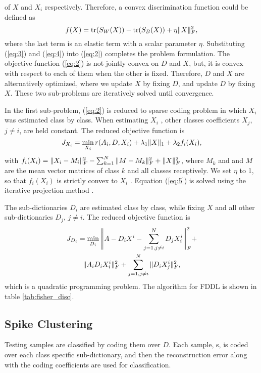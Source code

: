 \documentclass[conference]{IEEEtran}
\begin{document}
	of $X$ and $X_i$ respectively. Therefore, a convex discrimination
	function could be defined as
	\begin{equation}
		\label{eq:4}
		f(X)=\mathrm{tr}(S_W(X))-\mathrm{tr}(S_B(X))+\eta\Vert{X}\Vert_F^2,
	\end{equation}
	where the last term is an elastic term with a scalar parameter $\eta$. Substituting (\ref{eq:3}) and (\ref{eq:4}) into (\ref{eq:2}) completes the problem formulation. The objective function (\ref{eq:2}) is not jointly convex on $D$ and $X$, but, it is convex with respect to each of them when the other is fixed. Therefore, $D$ and $X$ are alternatively optimized, where we update $X$ by fixing $D$, and update $D$ by fixing $X$. These two sub-problems are iteratively solved until convergence.
	
	In the first sub-problem, (\ref{eq:2}) is reduced to sparse coding problem in which $X_i$ was estimated class by class. When estimating $X_i$ , other classes coefficients $X_j$, $j \neq i$, are held constant. The reduced objective function is
	\begin{equation}
		\label{eq:5}
		J_{X_i}=\min_{X_i}r(A_i,D,X_i)+\lambda_1\Vert{X}\Vert_1+\lambda_2f_i(X_i),
	\end{equation}
	with $f_i(X_i)=\Vert{X_i-M_i}\Vert_F^2-\sum_{k=1}^{N}\Vert{M-M_k}\Vert_F^2+\Vert{X}\Vert_F^2$, where $M_k$ and and $M$ are the mean vector matrices of class $k$ and all classes receptively. We set $\eta$ to 1, so that $f_i(X_i)$ is strictly convex to $X_i$ . Equation (\ref{eq:5}) is solved using the iterative projection method \cite{yang2011fisher}.
	
	The sub-dictionaries $D_i$ are estimated class by class, while fixing $X$ and all other sub-dictionaries $D_j$, $j\neq i$. The reduced objective function is
	\begin{multline}
		\label{eq:6}
		J_{D_i}=\min_{D_i}\Bigg\Vert{A-D_iX^i-\sum_{j=1,j\neq i}^{N}D_jX_i^i}\Bigg\Vert_F^2 + \\
		\Vert{A_iD_iX_i^i}\Vert_F^2+\sum_{j=1,j\neq i}^{N}\Vert{D_iX_j^i}\Vert_F^2,
	\end{multline}
	which is a quadratic programming problem. The algorithm for FDDL is shown in table \ref{tab:fisher_disc}.
	
	\subsection{Spike Clustering}
	Testing samples are classified by coding them over $D$. Each sample, s, is coded over each class specific sub-dictionary, and then the reconstruction error along with the coding coefficients are used for classification.
	
\end{document}
